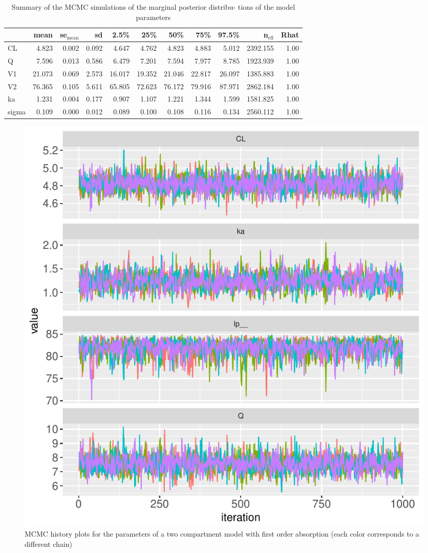 \documentclass[10pt, reqno, oneside]{amsbook}
\numberwithin{equation}{chapter}
\numberwithin{figure}{chapter}
\numberwithin{table}{chapter}
\theoremstyle{remark}
\begin{document}
\begin{table}[htbp]
\centering
\begin{tabular}{lrrrrrrrrrr}
\hline
 & mean & se\(_{\text{mean}}\) & sd & 2.5\% & 25\% & 50\% & 75\% & 97.5\% & n\(_{\text{eff}}\) & Rhat\\
\hline
CL & 4.823 & 0.002 & 0.092 & 4.647 & 4.762 & 4.823 & 4.883 & 5.012 & 2392.155 & 1.00\\
Q & 7.596 & 0.013 & 0.586 & 6.479 & 7.201 & 7.594 & 7.977 & 8.785 & 1923.939 & 1.00\\
V1 & 21.073 & 0.069 & 2.573 & 16.017 & 19.352 & 21.046 & 22.817 & 26.097 & 1385.883 & 1.00\\
V2 & 76.365 & 0.105 & 5.611 & 65.805 & 72.623 & 76.172 & 79.916 & 87.971 & 2862.184 & 1.00\\
ka & 1.231 & 0.004 & 0.177 & 0.907 & 1.107 & 1.221 & 1.344 & 1.599 & 1581.825 & 1.00\\
sigma & 0.109 & 0.000 & 0.012 & 0.089 & 0.100 & 0.108 & 0.116 & 0.134 & 2560.112 & 1.00\\
\hline
\end{tabular}
\caption{\label{tab:twocpt_summary}
Summary of the MCMC simulations of the marginal posterior distribu- tions of the model parameters}

\end{table}

\begin{figure}[htbp]
\centering
\includegraphics[width=0.6\linewidth]{../example-models/R/deliv/figure/TwoCptModel/TwoCptModelPlots001.pdf}
\caption{\label{twocpt_mcmc_history}
MCMC history plots for the parameters of a two compartment model with first order absorption (each color corresponds to a different chain)}
\end{figure}
\end{document}
